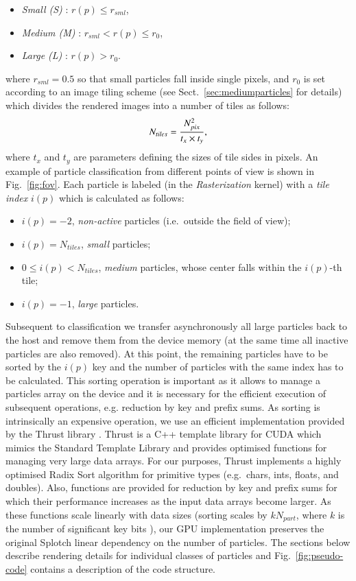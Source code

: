 \documentclass[preprint,5pt]{elsarticle}
\begin{document}
\begin{itemize}
\item
{\it Small (S)} : $r(p) \le r_{sml}$,
\item
{\it Medium (M)} : $r_{sml} < r(p) \le r_0$,
\item
{\it Large (L)} : $r(p) > r_0$.
\end{itemize}
where $r_{sml} = 0.5$ so that small particles fall inside single pixels, and 
$r_0$ is set according to an image tiling scheme (see Sect.~\ref{sec:mediumparticles} for details) which divides the rendered images
into a number of tiles as follows:  
\begin{equation}\label{tiles}
N_{tiles} = {N_{pix}^2\over t_x \times t_y},
\end{equation}
where $t_x$ and $t_y$ are parameters defining the sizes of tile sides in pixels.
An example of particle classification from different points of view is shown in Fig.~\ref{fig:fov}. Each particle is labeled (in the {\it Rasterization} kernel) with a {\it tile index} $i(p)$ which is calculated as follows:
\begin{itemize}
\item
$i(p) = -2$, {\it non-active} particles (i.e.\ outside the field of view);
\item
$i(p) = N_{tiles}$, {\it small} particles;
\item
$0 \le i(p) < N_{tiles}$, {\it medium} particles, whose center falls within the $i(p)$-th tile;
\item
$i(p) = -1$, {\it large} particles.
\end{itemize}

Subsequent to classification we transfer asynchronously all large particles back to the host and remove them from the device memory (at the same time all inactive particles are also removed). At this point, the remaining particles have to be sorted by the $i(p)$ key and the number of particles with the same index has to be calculated.
This sorting operation is important as it allows to manage a particles array on the device and it is  
necessary for the efficient execution of subsequent operations, e.g. reduction by key and prefix sums.
As sorting is intrinsically an expensive operation, we use an efficient implementation provided by the Thrust library \cite{thrusturl}. Thrust is a C++ template library for CUDA which mimics the Standard Template Library and provides optimised functions for managing very large data arrays. For our purposes, Thrust implements a highly optimised Radix Sort algorithm for primitive types (e.g.\ chars, ints, floats, and doubles). Also, functions are provided for reduction by key and prefix sums for which their performance increases as the input data arrays become larger. As these functions scale linearly with data sizes (sorting scales by $kN_{part}$, where $k$ is the number of significant key bits \cite{RadixSort}), our GPU implementation preserves the original Splotch linear dependency on the number of particles. The sections below describe rendering details for individual classes of particles and Fig.~\ref{fig:pseudo-code} contains a description of the code structure.
\end{document}

